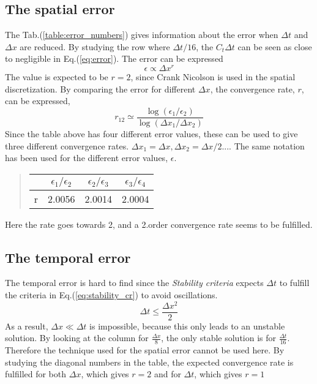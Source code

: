 \documentclass[%
twoside,                 %
final,                   %
chapterprefix=true,      %
open=right               %
10pt]{book}
\begin{document}
\noindent

\subsection{The spatial error}
The Tab.(\ref{table:error_numbers}) gives information about the error when $\Delta t$ and $\Delta x$ are reduced. By studying the row where $\Delta t/16$, the $C_t \Delta t$ can be seen as close to negligible in Eq.(\ref{eq:error}). The error can be expressed 
\begin{equation}
    \epsilon \propto \Delta x^r
\end{equation}
The value is expected to be $r=2$, since Crank Nicolson is used in the spatial discretization. By comparing the error for different $\Delta x$, the convergence rate, $r$, can be expressed, 
\begin{equation} \label{eq:conv_rate}
 r_{12} \simeq \frac{\log(\epsilon_1/\epsilon_2)}{\log(\Delta x_1/\Delta x_2)}
\end{equation}
Since the table above has four different error values, these can be used to give three different convergence rates. $\Delta x_1 = \Delta x, \Delta x_2 = \Delta x/2...$. The same notation has been used for the different error values, $\epsilon$.

\begin{quote}
\begin{tabular}{cccc}
\hline
\multicolumn{1}{c}{  } & \multicolumn{1}{c}{ $\epsilon_1/\epsilon_2$ } & \multicolumn{1}{c}{ $\epsilon_2/\epsilon_3$ } & \multicolumn{1}{c}{ $\epsilon_3/\epsilon_4$ } \\
\hline
r                       & 2.0056                  & 2.0014                  & 2.0004                  \\
\hline
\end{tabular}
\end{quote}

\noindent
Here the rate goes towards 2, and a 2.order convergence rate seems to be fulfilled.
\subsection{The temporal error}
The temporal error is hard to find since the \emph{Stability criteria} expects $\Delta t$ to fulfill the criteria in Eq.(\ref{eq:stability_cr}) to avoid oscillations.
\begin{equation} \label{eq:stability_cr}
 \Delta t \leq \frac{\Delta x^2}{2}
\end{equation}
As a result, $\Delta x \ll \Delta t$ is impossible, because this only leads to an unstable solution. By looking at the column for $\frac{\Delta x}{8}$, the only stable solution is for $\frac{\Delta t}{16}$. Therefore the technique used for the spatial error cannot be used here. By studying the diagonal numbers in the table, the expected convergence rate is fulfilled for both $\Delta x$, which gives $r = 2$ and for $\Delta t$, which gives $r=1$   
\end{document}

